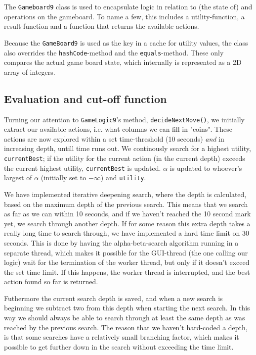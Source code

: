The \texttt{Gameboard9} class is used to encapsulate logic in relation to (the state of) and operations on the gameboard. To name a few, this includes a utility-function, a result-function and a function that returns the available actions.

Because the \texttt{GameBoard9} is used as the key in a cache for utility values, the class also overrides the \texttt{hashCode}-method and the \texttt{equals}-method. These only compares the actual game board state, which internally is represented as a 2D array of integers.

\subsection{Evaluation and cut-off function}

Turning our attention to \texttt{GameLogic9}'s method, \texttt{decideNextMove()}, we initially extract our available actions, i.e. what columns we can fill in "coins". These actions are now explored within a set time-threshold (10 seconds) \textit{and} in increasing depth, untill time runs out. We continously search for a highest utility, \texttt{currentBest}; if the utility for the current action (in the current depth) exceeds the current highest utility, \texttt{currentBest} is updated. $\alpha$ is updated to whoever's largest of $\alpha$ (initially set to $-\infty$) and \texttt{utility}.

We have implemented iterative deepening search, where the depth is calculated, based on the maximum depth of the previous search. This means that we search as far as we can within 10 seconds, and if we haven't reached the 10 second mark yet, we search through another depth. If for some reason this extra depth takes a really long time to search through, we have implemented a hard time limit on 30 seconds. This is done by having the alpha-beta-search algorithm running in a separate thread, which makes it possible for the GUI-thread (the one calling our logic) wait for the termination of the worker thread, but only if it doesn't exceed the set time limit. If this happens, the worker thread is interrupted, and the best action found so far is returned.

Futhermore the current search depth is saved, and when a new search is beginning we subtract two from this depth when starting the next search. In this way we should always be able to search through at least the same depth as was reached by the previous search. The reason that we haven't hard-coded a depth, is that some searches have a relatively small branching factor, which makes it possible to get further down in the search without exceeding the time limit.




